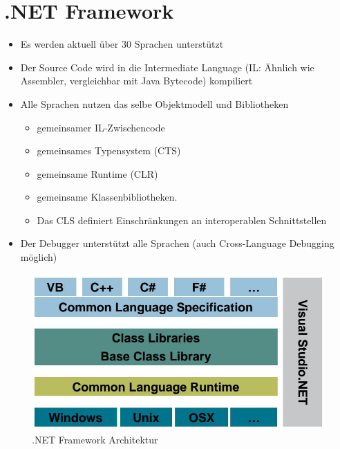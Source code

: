 \documentclass[
a4paper,
oneside,
10pt,
fleqn,
headsepline,
toc=listofnumbered, 
bibliography=totocnumbered]{scrartcl}
\let\stdsection\section
\renewcommand\section{\clearpage\stdsection}
\begin{document}
\section{.NET Framework}
\begin{itemize}
	\item Es werden aktuell über 30 Sprachen unterstützt
	\item Der Source Code wird in die Intermediate Language  (IL: Ähnlich wie Assembler, vergleichbar mit Java Bytecode) kompiliert
	\item Alle Sprachen nutzen das selbe Objektmodell und Bibliotheken
	\begin{itemize}
		\item gemeinsamer IL-Zwischencode
		\item gemeinsames Typensystem (CTS)
		\item gemeinsame Runtime (CLR)
		\item gemeinsame Klassenbibliotheken.
		\item Das CLS definiert Einschränkungen an interoperablen Schnittstellen
	\end{itemize}
	\item Der Debugger unterstützt alle Sprachen (auch Cross-Language Debugging möglich)
\end{itemize}
\begin{figure}[h]
\centering
\includegraphics[width=0.6\linewidth]{images/net_framework_architektur}
\caption{.NET Framework Architektur}
\label{fig:netframeworkarchitektur}
\end{figure}
\end{document}
